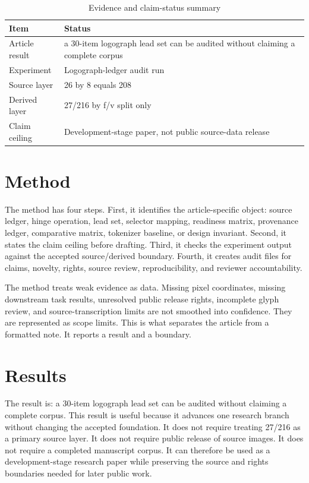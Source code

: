 \documentclass[sigconf,nonacm]{acmart}
\begin{document}
\begin{table}[t]
\caption{Evidence and claim-status summary}
\label{tab:article_na_004}
\begin{tabular}{p{}p{}}
\toprule
Item & Status \\
\midrule
Article result & a 30-item logograph lead set can be audited without claiming a complete corpus \\
Experiment & Logograph-ledger audit run \\
Source layer & 26 by 8 equals 208 \\
Derived layer & 27/216 by f/v split only \\
Claim ceiling & Development-stage paper, not public source-data release \\
\bottomrule
\end{tabular}
\end{table}


\section{Method}
The method has four steps. First, it identifies the article-specific object:
source ledger, hinge operation, lead set, selector mapping, readiness matrix,
provenance ledger, comparative matrix, tokenizer baseline, or design invariant.
Second, it states the claim ceiling before drafting. Third, it checks the
experiment output against the accepted source/derived boundary. Fourth, it
creates audit files for claims, novelty, rights, source review, reproducibility,
and reviewer accountability.

The method treats weak evidence as data. Missing pixel coordinates, missing
downstream task results, unresolved public release rights, incomplete glyph
review, and source-transcription limits are not smoothed into confidence. They
are represented as scope limits. This is what separates the article from a
formatted note. It reports a result and a boundary.

\section{Results}
The result is: a 30-item logograph lead set can be audited without claiming a complete corpus. This result is useful because it advances one research
branch without changing the accepted foundation. It does not require treating
27/216 as a primary source layer. It does not require public release of source
images. It does not require a completed manuscript corpus. It can therefore be
used as a development-stage research paper while preserving the source and rights
boundaries needed for later public work.
\end{document}
